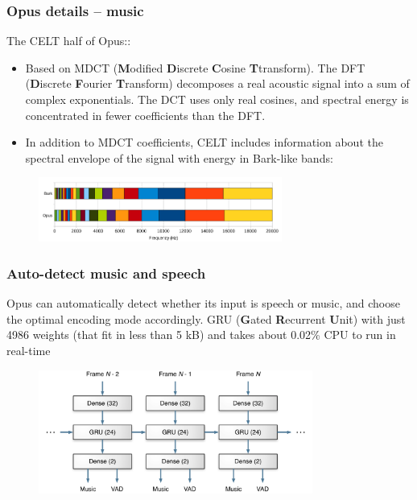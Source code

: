\documentclass{beamer}
\begin{document}
\begin{frame}
	\frametitle{Opus details -- music}
	The CELT half of Opus::
	\begin{itemize}
		\item
			Based on MDCT (\textbf{M}odified \textbf{D}iscrete \textbf{C}osine \textbf{T}transform). The DFT (\textbf{D}iscrete \textbf{F}ourier \textbf{T}ransform) decomposes a real acoustic signal into a sum of complex exponentials. The DCT uses only real cosines, and spectral energy is concentrated in fewer coefficients than the DFT.
		\item
			In addition to MDCT coefficients, CELT includes information about the spectral envelope of the signal with energy in Bark-like bands:
	\end{itemize}
	\begin{figure}
	\includegraphics[width=8cm]{./bark.png}
	\end{figure}
\end{frame}


\begin{frame}
	\frametitle{Auto-detect music and speech}
	Opus can automatically detect whether its input is speech or music, and choose the optimal encoding mode accordingly. GRU (\textbf{G}ated \textbf{R}ecurrent \textbf{U}nit) with just 4986 weights (that fit in less than 5 kB) and takes about 0.02\% CPU to run in real-time
	\begin{figure}
	\includegraphics[width=9cm]{./opus_gru.png}
	\end{figure}
\end{frame}
\end{document}

